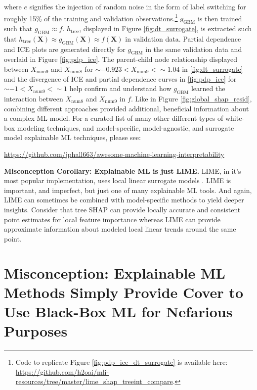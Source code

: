 \documentclass[fleqn]{article}
\begin{document}
\noindent where $e$ signifies the injection of random noise in the form of label switching for roughly 15\% of the training and validation observations.\footnote{Code to replicate Figure \ref{fig:pdp_ice_dt_surrogate} is available here: \url{https://github.com/h2oai/mli-resources/tree/master/lime_shap_treeint_compare}.} $g_{\text{GBM}}$ is then trained such that $g_{\text{GBM}} \approx f$. $h_{\text{tree}}$, displayed in Figure \ref{fig:dt_surrogate}, is extracted such that $h_{\text{tree}}(\mathbf{X}) \approx g_{\text{GBM}}(\mathbf{X}) \approx f(\mathbf{X})$ in validation data. Partial dependence and ICE plots are generated directly for $g_{\text{GBM}}$ in the same validation data and overlaid in Figure \ref{fig:pdp_ice}. The parent-child node relationship displayed between $X_{\text{num9}}$ and $X_{\text{num8}}$ for $\sim -0.923 < X_{\text{num9}} <  \sim 1.04$ in \ref{fig:dt_surrogate} and the divergence of ICE and partial dependence curves in \ref{fig:pdp_ice} for $\sim -1 < X_{\text{num9}} <  \sim 1$ help confirm and understand how $g_{\text{GBM}}$ learned the interaction between $X_{\text{num}8}$ and $X_{\text{num}9}$ in $f$. Like in Figure \ref{fig:global_shap_resid}, combining different approaches provided additional, beneficial information about a complex ML model. For a curated list of many other different types of white-box modeling techniques, and model-specific, model-agnostic, and surrogate model explainable ML techniques, please see:

\begin{center}
\url{https://github.com/jphall663/awesome-machine-learning-interpretability}
\end{center}

\textbf{Misconception Corollary: Explainable ML is just LIME.} LIME, in it's most popular implementation, uses local linear surrogate models \cite{lime}. LIME is important, and imperfect, but just one of many explainable ML tools. And again, LIME can sometimes be combined with model-specific methods to yield deeper insights. Consider that tree SHAP can provide locally accurate and consistent point estimates for local feature importance whereas LIME can provide approximate information about modeled local linear trends around the same point. 


\section{Misconception: Explainable ML Methods Simply Provide Cover to Use Black-Box ML for Nefarious Purposes}
\end{document}
